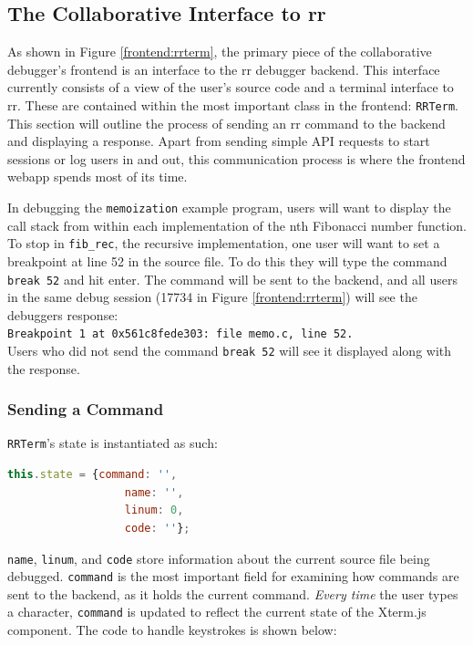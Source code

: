 \documentclass[12pt]{article}
\begin{document}
\subsection{The Collaborative Interface to rr}

As shown in Figure \ref{frontend:rrterm}, the primary piece of the
collaborative debugger's frontend is an interface to the rr debugger
backend.  This interface currently consists of a view of the user's
source code and a terminal interface to rr.  These are contained
within the most important class in the frontend: \lstinline{RRTerm}.
This section will outline the process of sending an rr command to the
backend and displaying a response.  Apart from sending simple API
requests to start sessions or log users in and out, this communication
process is where the frontend webapp spends most of its time.
\par

In debugging the \lstinline{memoization} example program, users will
want to display the call stack from within each implementation of the
nth Fibonacci number function.  To stop in \lstinline{fib_rec}, the
recursive implementation, one user will want to set a breakpoint at
line 52 in the source file.  To do this they will type the command
\lstinline{break 52} and hit enter.  The command will be sent to the
backend, and all users in the same debug session (17734 in Figure
\ref{frontend:rrterm}) will see the debuggers response:\\
\lstinline{Breakpoint 1 at 0x561c8fede303: file memo.c, line 52.}\\
Users who did not send the command \lstinline{break 52} will see it
displayed along with the response.

\subsubsection{Sending a Command}

\lstinline{RRTerm}'s state is instantiated as such:

\begin{lstlisting}[language=Javascript,basicstyle=\linespread{0.5}\ttfamily,caption={RRTerm's State},captionpos=b]
  this.state = {command: '',
                  name: '',
                  linum: 0,
                  code: ''};
\end{lstlisting}

\lstinline{name}, \lstinline{linum}, and \lstinline{code} store
information about the current source file being debugged.
\lstinline{command} is the most important field for examining how
commands are sent to the backend, as it holds the current command.
\textit{Every time} the user types a character, \lstinline{command} is
updated to reflect the current state of the Xterm.js component.  The
code to handle keystrokes is shown below:
\end{document}

